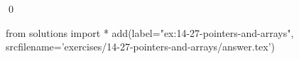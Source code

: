 
\begin{ex}
  \label{ex:14-27-pointers-and-arrays}
  
  \qed
\end{ex}
\begin{python0}
from solutions import *
add(label="ex:14-27-pointers-and-arrays",
    srcfilename='exercises/14-27-pointers-and-arrays/answer.tex')
\end{python0}
